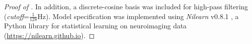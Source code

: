 \begin{proof}[Proof of ]
In addition, a discrete-cosine basis was included for high-pass filtering
(\textit{cutoff}=$\frac{1}{128}\textrm{Hz}$).
%
Model specification was implemented using \textit{Nilearn} v0.8.1
\citep{Abraham2014}, a Python library for statistical learning on neuroimaging
data (\url{https://nilearn.github.io}).



\end{proof}